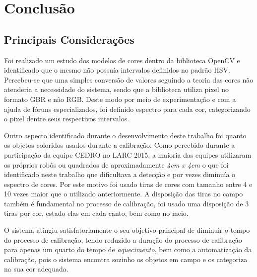 
\chapter{Conclusão} \label{Cap:Conclusao}

\section{Principais Considerações}
	Foi realizado um estudo dos modelos de cores dentro da biblioteca OpenCV e identificado que o mesmo não possuía intervalos definidos no padrão HSV. Percebeu-se que uma simples conversão de valores seguindo a teoria das cores não atenderia a necessidade do sistema, sendo que a biblioteca utiliza pixel no formato GBR e não RGB. Deste modo por meio de experimentação e com a ajuda de fóruns especializados, foi definido espectro para cada cor, categorizando o pixel dentre seus respectivos intervalos.
	
	Outro aspecto identificado durante o desenvolvimento deste trabalho foi quanto os objetos coloridos usados durante a calibração. Como percebido durante a participação da equipe CEDRO no LARC 2015, a maioria das equipes utilizaram os próprios robôs ou quadrados de aproximadamente \textit{4cm x 4cm} o que foi identificado neste trabalho que dificultava a detecção e por vezes diminuía o espectro de cores. Por este motivo foi usado tiras de cores com tamanho entre 4 e 10 vezes maior que o utilizado anteriormente. A disposição das tiras no campo também é fundamental no processo de calibração, foi usado uma disposição de 3 tiras por cor, estado elas em cada canto, bem como no meio. 
	
	O sistema atingiu satisfatoriamente o seu objetivo principal de diminuir o tempo do processo de calibração, tendo reduzido a duração do processo de calibração para apenas um quarto do tempo de \emph{aquecimento}, bem como a automatização da calibração, pois o sistema encontra sozinho os objetos em campo e os categoriza na sua cor adequada. 

